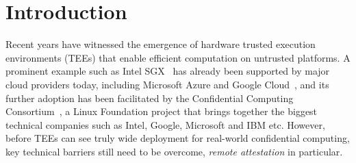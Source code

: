 \section{Introduction}\label{sec-introduction}

Recent years have witnessed the emergence of hardware trusted execution environments (TEEs) that enable efficient computation on untrusted platforms. 
A prominent example such as Intel SGX~\cite{mckeen2013innovative} has already been supported by major cloud providers today, including Microsoft Azure and Google Cloud~\cite{russinovich2017introducing,asylo2019}, and its further adoption has been facilitated by the Confidential Computing Consortium~\cite{ccc2019}, a Linux Foundation project that brings together the biggest technical companies such as Intel, Google, Microsoft and IBM etc. However, before TEEs can see truly wide deployment for real-world confidential computing, key technical barriers still need to be overcome, \textit{remote attestation} in particular.

